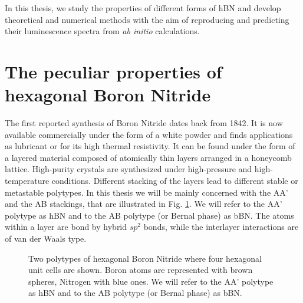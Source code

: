 In this thesis, we study the properties of different forms of \acrshort{hBN} and develop theoretical and numerical methods with the aim of reproducing and predicting their luminescence spectra from \textit{ab initio} calculations.


\section*{The peculiar properties of hexagonal Boron Nitride}
The first reported synthesis of Boron Nitride dates back from 1842.\cite{balmain1842xlvi} It is now available commercially under the form of a white powder and finds applications as lubricant or for its high thermal resistivity. It can be found under the form of a layered material composed of atomically thin layers arranged in a honeycomb lattice. High-purity crystals are synthesized under high-pressure and high-temperature conditions.\cite{watanabe2004direct} 
Different stacking of the layers lead to different stable or metastable polytypes. In this thesis we will be mainly concerned with the AA' and the AB stackings, that are illustrated in Fig. \ref{fig:hBN_stackings}. We will refer to the AA' polytype as hBN and to the AB polytype (or Bernal phase) as bBN. The atoms within a layer are bond by hybrid $sp^2$ bonds, while the interlayer interactions are of van der Waals type.
\begin{figure}[h!t]%
	\vspace{0.2cm}
	\setcapindent{2em}
	\centering
     \qquad
    \caption{Two polytypes of hexagonal Boron Nitride where four hexagonal unit cells are shown. Boron atoms are represented with brown spheres, Nitrogen with blue ones. We will refer to the AA' polytype as hBN and to the AB polytype (or Bernal phase) as bBN.}
	\label{fig:hBN_stackings}
\end{figure}
%
